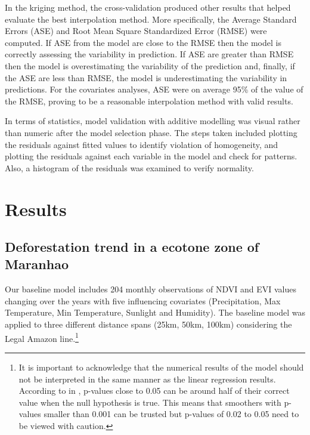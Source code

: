 In the kriging method, the cross-validation produced other results that helped evaluate the best interpolation method. More specifically, the Average Standard Errors (ASE) and Root Mean Square Standardized Error (RMSE) were computed. If ASE from the model are close to the RMSE then the model is correctly assessing the variability in prediction. If ASE are greater than RMSE then the model is overestimating the variability of the prediction and, finally, if the ASE are less than RMSE, the model is underestimating the variability in predictions. For the covariates analyses, ASE were on average 95\% of the value of the RMSE, proving to be a reasonable interpolation method with valid results.

In terms of statistics, model validation with additive modelling was visual rather than numeric after the model selection phase. The steps taken included plotting the residuals against fitted values to identify violation of homogeneity, and plotting the residuals against each variable in the model and check for patterns. Also, a histogram of the residuals was examined to verify normality. 



\section{Results}  %

\subsection{Deforestation trend in a ecotone zone of Maranhao} \label{resultssection1}


Our baseline model includes 204 monthly observations of NDVI and EVI values changing over the years with five influencing covariates (Precipitation, Max Temperature, Min Temperature, Sunlight and Humidity). The baseline model was applied to three different distance spans (25km, 50km, 100km) considering the Legal Amazon line.\footnote{It is important to acknowledge that the numerical results of the model should not be interpreted in the same manner as the linear regression results. According to \citet{Wood_2011} in \citet{zuur_saveliev_ieno_2014}, p-values close to 0.05 can be around half of their correct value when the null hypothesis is true. This means that smoothers with p-values smaller than 0.001 can be trusted but p-values of 0.02 to 0.05 need to be viewed with caution.} 

